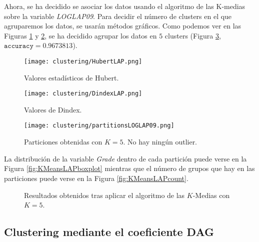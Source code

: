 Ahora, se ha decidido se asociar los datos usando el algoritmo de las K-medias sobre la variable \emph{LOGLAP09}. Para decidir el número de clusters en el que agruparemos los datos, se usarán métodos gráficos. Como podemos ver en las Figuras \ref{fig:indiceshubertLAP} y \ref{fig:indicesdindexLAP}, se ha decidido agrupar los datos en $5$ clusters (Figura \ref{fig:KMeansLAP}, $\texttt{accuracy} = 0.9673813$).

\begin{figure}[H]
    \centering
    \texttt{[image: clustering/HubertLAP.png]}
    \caption{Valores estadísticos de Hubert.}
    \label{fig:indiceshubertLAP}
\end{figure}

\begin{figure}[H]
    \centering
    \texttt{[image: clustering/DindexLAP.png]}
    \caption{Valores de Dindex.}
    \label{fig:indicesdindexLAP}
\end{figure}

\begin{figure}[H]
    \centering
    \texttt{[image: clustering/partitionsLOGLAP09.png]}
    \caption{Particiones obtenidas con $K = 5$. No hay ningún outlier.}
    \label{fig:KMeansLAP}
\end{figure}

La distribución de la variable \emph{Grade} dentro de cada partición puede verse en la Figura \ref{fig:KMeansLAPboxplot} mientras que el número de grupos que hay en las particiones puede verse en la Figura \ref{fig:KMeansLAPcount}.

\begin{figure}[H]
\centering
{}\qquad
{}%
\caption{Resultados obtenidos tras aplicar el algoritmo de las $K$-Medias con $K = 5$.}
\label{fig:KMeansLAPdetails}
\end{figure}

\subsection{Clustering mediante el coeficiente DAG}